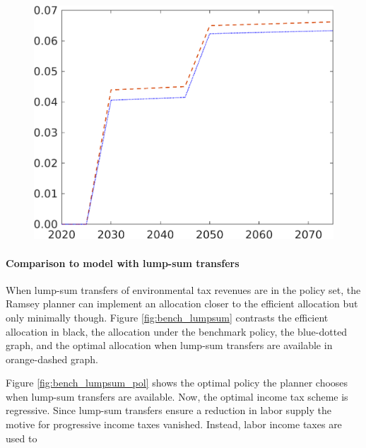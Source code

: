 \begin{figure}[h!!]
\begin{minipage}[]{0.32\textwidth}
\end{minipage}
\begin{minipage}[]{0.32\textwidth}
	\includegraphics[width=1\textwidth]{../../codding_model/own_basedOnFried/optimalPol_190722_tidiedUp/figures/all_July22/GovCon_DDCompEffOPT_T_NoTaus_pol3_spillover0_noskill0_sep1_xgrowth0_etaa0.79_lgd0_lff0.png}
\end{minipage}
\end{figure}

\paragraph{Comparison to model with lump-sum transfers}

When lump-sum transfers of environmental tax revenues are in the policy set, the Ramsey planner can implement an allocation closer to the efficient allocation but only minimally though. Figure \ref{fig:bench_lumpsum} contrasts the efficient allocation in black, the allocation under the benchmark policy, the blue-dotted graph, and the optimal allocation when lump-sum transfers are available in orange-dashed graph. 

Figure \ref{fig:bench_lumpsum_pol} shows the optimal policy the planner chooses when lump-sum transfers are available. 
Now, the optimal income tax scheme is regressive. Since lump-sum transfers ensure a reduction in labor supply the motive for progressive income taxes vanished. Instead, labor income taxes are used to 



